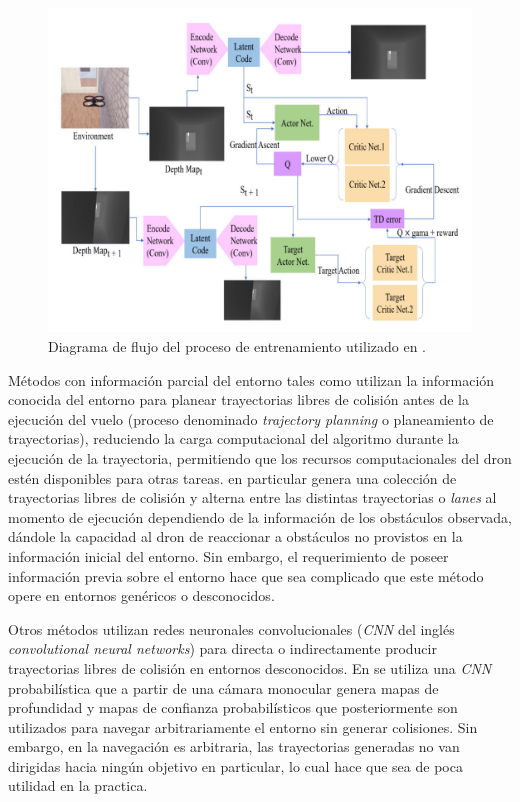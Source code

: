     \begin{figure}[H]
        \centering
        \includegraphics[scale=0.4]{partes/img/RL-training-process.png}
        \caption[Diagrama de flujo del proceso de entrenamiento utilizado en \textit{Vision Based Drone Obstacle Avoidance by Deep Reinforcement Learning}]{Diagrama de flujo del proceso de entrenamiento utilizado en \cite{Xue2021}.}
        \label{fig:rl-training-process}
    \end{figure}

    \par Métodos con información parcial del entorno tales como \cite{Zhang2019} utilizan la información conocida del entorno para planear trayectorias libres de colisión antes de la ejecución del vuelo (proceso denominado \textit{trajectory planning} o planeamiento de trayectorias), reduciendo la carga computacional del algoritmo durante la ejecución de la trayectoria, permitiendo que los recursos computacionales del dron estén disponibles para otras tareas. \cite{Zhang2019} en particular genera una colección de trayectorias libres de colisión y alterna entre las distintas trayectorias o \textit{lanes} al momento de ejecución dependiendo de la información de los obstáculos observada, dándole la capacidad al dron de reaccionar a obstáculos no provistos en la información inicial del entorno. Sin embargo, el requerimiento de poseer información previa sobre el entorno hace que sea complicado que este método opere en entornos genéricos o desconocidos.

    \par Otros métodos utilizan redes neuronales convolucionales (\textit{CNN} del inglés \textit{convolutional neural networks}) para directa o indirectamente producir trayectorias libres de colisión en entornos desconocidos. En \cite{Yang2021} se utiliza una \textit{CNN} probabilística que a partir de una cámara monocular genera mapas de profundidad y mapas de confianza probabilísticos que posteriormente son utilizados para navegar arbitrariamente el entorno sin generar colisiones. Sin embargo, en \cite{Yang2021} la navegación es arbitraria, las trayectorias generadas no van dirigidas hacia ningún objetivo en particular, lo cual hace que sea de poca utilidad en la practica.

